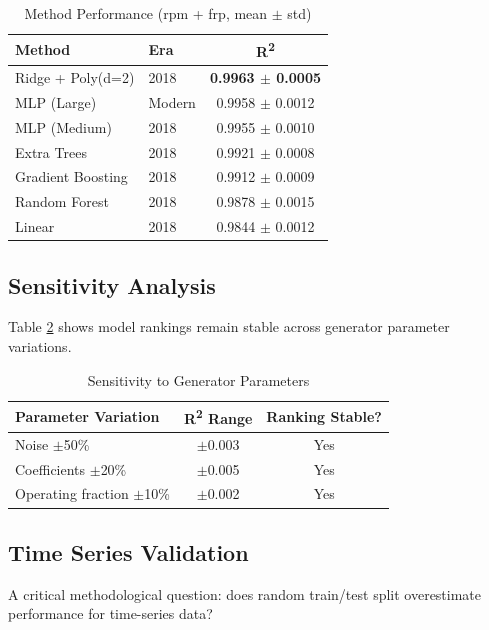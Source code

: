 \documentclass[conference]{IEEEtran}
\begin{document}
\begin{table}[htbp]
\caption{Method Performance (rpm + frp, mean $\pm$ std)}
\label{tab:method_comparison}
\centering
\begin{tabular}{llc}
\toprule
\textbf{Method} & \textbf{Era} & \textbf{R\textsuperscript{2}} \\
\midrule
Ridge + Poly(d=2) & 2018 & \textbf{0.9963 $\pm$ 0.0005} \\
MLP (Large) & Modern & 0.9958 $\pm$ 0.0012 \\
MLP (Medium) & 2018 & 0.9955 $\pm$ 0.0010 \\
Extra Trees & 2018 & 0.9921 $\pm$ 0.0008 \\
Gradient Boosting & 2018 & 0.9912 $\pm$ 0.0009 \\
Random Forest & 2018 & 0.9878 $\pm$ 0.0015 \\
Linear & 2018 & 0.9844 $\pm$ 0.0012 \\
\bottomrule
\end{tabular}
\end{table}

\subsection{Sensitivity Analysis}

Table \ref{tab:sensitivity} shows model rankings remain stable across generator parameter variations.

\begin{table}[htbp]
\caption{Sensitivity to Generator Parameters}
\label{tab:sensitivity}
\centering
\begin{tabular}{lcc}
\toprule
\textbf{Parameter Variation} & \textbf{R\textsuperscript{2} Range} & \textbf{Ranking Stable?} \\
\midrule
Noise $\pm$50\% & $\pm$0.003 & Yes \\
Coefficients $\pm$20\% & $\pm$0.005 & Yes \\
Operating fraction $\pm$10\% & $\pm$0.002 & Yes \\
\bottomrule
\end{tabular}
\end{table}

\subsection{Time Series Validation}

A critical methodological question: does random train/test split overestimate performance for time-series data?
\end{document}
